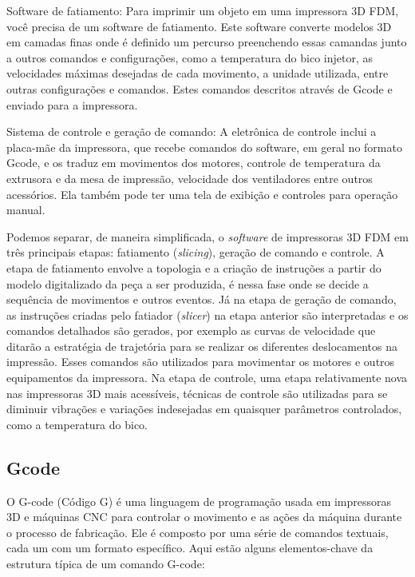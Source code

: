 Software de fatiamento: Para imprimir um objeto em uma impressora 3D FDM, você precisa de um software de fatiamento. 
Este software converte modelos 3D em camadas finas onde é definido um percurso preenchendo essas camandas junto
a outros comandos e configurações, como a temperatura do bico injetor, as velocidades máximas desejadas de cada movimento,
a unidade utilizada, entre outras configurações e comandos. Estes comandos descritos através de Gcode e enviado para a impressora. 

Sistema de controle e geração de comando: A eletrônica de controle inclui a placa-mãe da impressora, que recebe comandos do 
software, em geral no formato Gcode, e os traduz em movimentos dos motores, controle de temperatura da extrusora e da mesa de impressão, 
velocidade dos ventiladores entre outros acessórios. 
Ela também pode ter uma tela de exibição e controles para operação manual.

Podemos separar, de maneira simplificada, o \textit{software} de impressoras 3D
FDM em três principais etapas: fatiamento (\textit{slicing}), geração de comando e controle.
A etapa de fatiamento envolve a topologia e a criação de instruções a partir do modelo digitalizado da peça a ser produzida,
é nessa fase onde se decide a sequência de movimentos e outros eventos.
Já na etapa de geração de comando, as instruções criadas pelo fatiador (\textit{slicer}) na etapa anterior
são interpretadas e os comandos detalhados são gerados, por exemplo as curvas de velocidade que ditarão a 
estratégia de trajetória para se realizar os diferentes deslocamentos na impressão.
Esses comandos são utilizados para movimentar os motores e outros equipamentos da impressora.
Na etapa de controle, uma etapa relativamente nova nas impressoras 3D mais acessíveis, 
técnicas de controle são utilizadas para se diminuir vibrações e variações indesejadas em quaisquer
parâmetros controlados, como a temperatura do bico.

\subsection{Gcode}

O G-code (Código G) é uma linguagem de programação usada em impressoras 3D e máquinas CNC para controlar o movimento e as ações da máquina durante o processo de fabricação. Ele é composto por uma série de comandos textuais, cada um com um formato específico. Aqui estão alguns elementos-chave da estrutura típica de um comando G-code:

